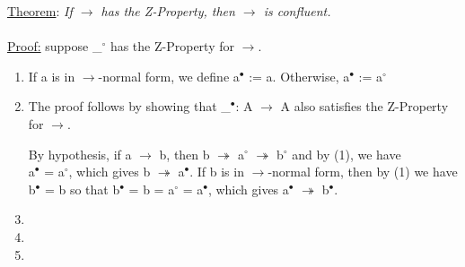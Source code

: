\documentclass[]{article}
\begin{document}
\underline{Theorem}: \textit{If $\rightarrow$ has the Z-Property, then $\rightarrow$ is confluent.} \\\\
\underline{Proof:} suppose \_$^{\circ}$ has the Z-Property for $\rightarrow$. 

\begin{enumerate}
	\item If a is in $\rightarrow$-normal form, we define a$^{\bullet}$ := a. Otherwise, a$^{\bullet}$ := a$^{\circ}$
	\item The proof follows by showing that \_$^{\bullet}$: A $\rightarrow$ A also satisfies the Z-Property for $\rightarrow$.
	
	By hypothesis, if a $\rightarrow$ b, then b $\twoheadrightarrow$ a$^{\circ}$ $\twoheadrightarrow$ b$^{\circ}$ and by (1), we have \\ a$^{\bullet}$ = a$^{\circ}$, which gives b $\twoheadrightarrow$ a$^{\bullet}$. If b is in $\rightarrow$-normal form, then by (1) we have b$^{\bullet}$ = b so that b$^{\bullet}$ = b = a$^{\circ}$ = a$^{\bullet}$, which gives a$^{\bullet}$ $\twoheadrightarrow$ b$^{\bullet}$.
	
	\item
	\item
	\item
	
\end{enumerate}
\end{document}
